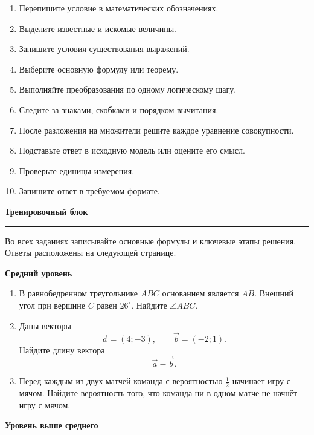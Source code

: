 \documentclass[a4paper,12pt]{article}
\newcommand{\topic}[1]{%
  \par\bigskip
  {\Large\bfseries\color{darkaccent}#1\par}
  \vspace{0.2em}
  {\color{accent}\rule{\linewidth}{0.7pt}}
  \vspace{0.55em}
}
\newcommand{\subtopic}[1]{%
  \par\medskip
  {\large\bfseries\color{darkaccent}#1\par}
  \vspace{0.2em}
}
\begin{document}
\begin{enumerate}
  \item Перепишите условие в математических обозначениях.
  \item Выделите известные и искомые величины.
  \item Запишите условия существования выражений.
  \item Выберите основную формулу или теорему.
  \item Выполняйте преобразования по одному логическому шагу.
  \item Следите за знаками, скобками и порядком вычитания.
  \item После разложения на множители решите каждое уравнение совокупности.
  \item Подставьте ответ в исходную модель или оцените его смысл.
  \item Проверьте единицы измерения.
  \item Запишите ответ в требуемом формате.
\end{enumerate}

\clearpage
\thispagestyle{fancy}

\topic{Тренировочный блок}

Во всех заданиях записывайте основные формулы и ключевые этапы
решения. Ответы расположены на следующей странице.

\subtopic{Средний уровень}

\begin{enumerate}
  \item
  В равнобедренном треугольнике \(ABC\) основанием является
  \(AB\). Внешний угол при вершине \(C\) равен \(26^\circ\).
  Найдите \(\angle ABC\).

  \item
  Даны векторы
  \[
  \vec a=(4;-3),
  \qquad
  \vec b=(-2;1).
  \]
  Найдите длину вектора
  \[
  \vec a-\vec b.
  \]

  \item
  Перед каждым из двух матчей команда с вероятностью
  \(\frac12\) начинает игру с мячом. Найдите вероятность того,
  что команда ни в одном матче не начнёт игру с мячом.
\end{enumerate}

\subtopic{Уровень выше среднего}
\end{document}

